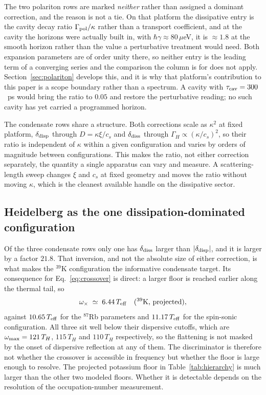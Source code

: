\documentclass[aps,prd,reprint,nofootinbib,superscriptaddress]{revtex4-2}
\begin{document}
The two polariton rows are marked \emph{neither} rather than assigned a
dominant correction, and the reason is not a tie. On that platform the
dissipative entry is the cavity decay ratio $\Gamma_{\rm pol}/\kappa$
rather than a transport coefficient, and at the cavity the horizons were
actually built in, with $\hbar\gamma \approx 80\,\mu$eV, it is
$\approx 1.8$ at the smooth horizon rather than the value a perturbative
treatment would need. Both expansion parameters are of order unity there,
so neither entry is the leading term of a converging series and the
comparison the column is for does not apply. Section~\ref{sec:polariton}
develops this, and it is why that platform's contribution to this paper
is a scope boundary rather than a spectrum. A cavity with
$\tau_{\rm cav} = 300$~ps would bring the ratio to $0.05$ and restore the
perturbative reading; no such cavity has yet carried a programmed
horizon.

The condensate rows share a structure. Both corrections scale as
$\kappa^2$ at fixed platform, $\delta_{\rm disp}$ through
$D = \kappa\xi/c_s$ and $\delta_{\rm diss}$ through
$\Gamma_H \propto (\kappa/c_s)^2$, so their ratio is independent of
$\kappa$ within a given configuration and varies by orders of magnitude
between configurations. This makes the ratio, not either correction
separately, the quantity a single apparatus can vary and measure. A
scattering-length sweep changes $\xi$ and $c_s$ at fixed geometry and
moves the ratio without moving $\kappa$, which is the cleanest available
handle on the dissipative sector.

\subsection{Heidelberg as the one dissipation-dominated configuration}
\label{sec:hier-heidelberg}

Of the three condensate rows only one has $\delta_{\rm diss}$ larger
than $|\delta_{\rm disp}|$, and it is larger by a factor $21.8$. That
inversion, and not the absolute size of either correction, is what makes
the $^{39}$K configuration the informative condensate target. Its
consequence for Eq.~\eqref{eq:crossover} is direct: a larger floor is
reached earlier along the thermal tail, so
\begin{equation*}
\omega_\times \;\simeq\; 6.44\,T_{\rm eff}
  \quad (^{39}\text{K, projected}),
\end{equation*}
against $10.65\,T_{\rm eff}$ for the $^{87}$Rb parameters and
$11.17\,T_{\rm eff}$ for the spin-sonic configuration. All three sit
well below their dispersive cutoffs, which are
$\omega_{\rm max} = 121\,T_H$, $115\,T_H$ and $110\,T_H$ respectively,
so the flattening is not masked by the onset of dispersive reflection at
any of them. The discriminator is therefore not whether the crossover is
accessible in frequency but whether the floor is large enough to
resolve. The projected potassium floor in
Table~\ref{tab:hierarchy} is much larger than the other two modeled
floors. Whether it is detectable depends on the resolution of the
occupation-number measurement.
\end{document}
